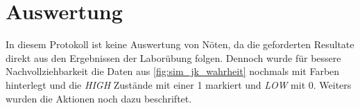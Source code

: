 \documentclass[12pt,english,ngerman]{scrartcl}
\begin{document}

\section{Auswertung}\label{sec:Auswertung}
In diesem Protokoll ist keine Auswertung von Nöten, da die geforderten Resultate
direkt aus den Ergebnissen der Laborübung folgen. Dennoch wurde für bessere 
Nachvollziehbarkeit die Daten aus \autoref{fig:sim_jk_wahrheit} nochmals mit Farben
hinterlegt und die \textit{HIGH} Zustände mit einer 1 markiert und \textit{LOW} mit 0. Weiters wurden die Aktionen noch dazu beschriftet.
\end{document}
